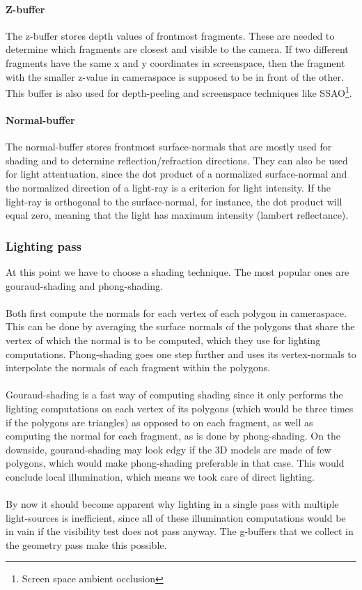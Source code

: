 \documentclass{ACGSeminar}
\begin{document}
		\paragraph{Z-buffer}
			The z-buffer stores depth values of frontmost fragments. These are needed to determine which fragments are closest and visible to the camera. If two different fragments have the same x and y coordinates in screenspace, then the fragment with the smaller z-value in cameraspace is supposed to be in front of the other. This buffer is also used for depth-peeling and screenspace techniques like SSAO\footnote{Screen space ambient occlusion}. 
		\paragraph{Normal-buffer}
			The normal-buffer stores frontmost surface-normals that are mostly used for shading and to determine reflection/refraction directions. They can also be used for light attentuation, since the dot product of a normalized surface-normal and the normalized direction of a light-ray is a criterion for light intensity. If the light-ray is orthogonal to the surface-normal, for instance, the dot product will equal zero, meaning that the light has maximum intensity (lambert reflectance).

	\subsubsection{Lighting pass}
		At this point we have to choose a shading technique. The most popular ones are gouraud-shading and phong-shading. \\\\
		Both first compute the normals for each vertex of each polygon in cameraspace. This can be done by averaging the surface normals of the polygons that share the vertex of which the normal is to be computed, which they use for lighting computations. Phong-shading goes one step further and uses its vertex-normals to interpolate the normals of each fragment within the polygons. \\\\
		Gouraud-shading is a fast way of computing shading since it only performs the lighting computations on each vertex of its polygons (which would be three times if the polygons are triangles) as opposed to on each fragment, as well as computing the normal for each fragment, as is done by phong-shading. On the downside, gouraud-shading may look edgy if the 3D models are made of few polygons, which would make phong-shading preferable in that case. This would conclude local illumination, which means we took care of direct lighting. \\\\
		By now it should become apparent why lighting in a single pass with multiple light-sources is inefficient, since all of these illumination computations would be in vain if the visibility test does not pass anyway. The g-buffers that we collect in the geometry pass make this possible. 
\end{document}
